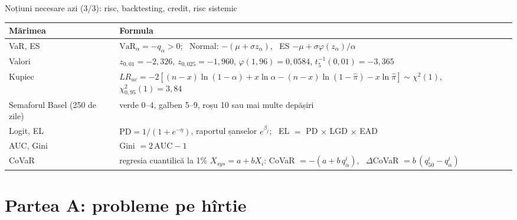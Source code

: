 \begin{frame}{Noțiuni necesare azi (3/3): risc, backtesting, credit, risc sistemic}
\itemsize{\small}
{\renewcommand{\arraystretch}{1.3}\begin{center}
\footnotesize
\begin{tabular}{ll}
\toprule
\textbf{Mărimea} & \textbf{Formula} \\
\midrule
VaR, ES & $\mathrm{VaR}_\alpha = -q_\alpha > 0$; \ Normal: $-(\mu + \sigma z_\alpha)$, \ ES $-\mu + \sigma\varphi(z_\alpha)/\alpha$ \\
Valori & $z_{0{,}01} = -2{,}326$, $z_{0{,}025} = -1{,}960$, $\varphi(1{,}96) = 0{,}0584$, $t_5^{-1}(0{,}01) = -3{,}365$ \\
Kupiec & $LR_{uc} = -2[(n - x)\ln(1 - \alpha) + x\ln\alpha - (n - x)\ln(1 - \hat\pi) - x\ln\hat\pi] \sim \chi^2(1)$, \ $\chi^2_{0{,}95}(1) = 3{,}84$ \\
Semaforul Basel (250 de zile) & verde 0--4, galben 5--9, roșu 10 sau mai multe depășiri \\
Logit, EL & $\mathrm{PD} = 1/(1 + e^{-\eta})$, raportul șanselor $e^{\beta_j}$; \ EL $=$ PD $\times$ LGD $\times$ EAD \\
AUC, Gini & Gini $= 2\,\mathrm{AUC} - 1$ \\
CoVaR & regresia cuantilică la 1\% $X_{sys} = a + bX_i$: CoVaR $= -(a + b\,q_\alpha^i)$, \ $\Delta$CoVaR $= b\,(q_{50}^i - q_\alpha^i)$ \\
\bottomrule
\end{tabular}
\end{center}
}
\end{frame}


\section{Partea A: probleme pe hîrtie}

